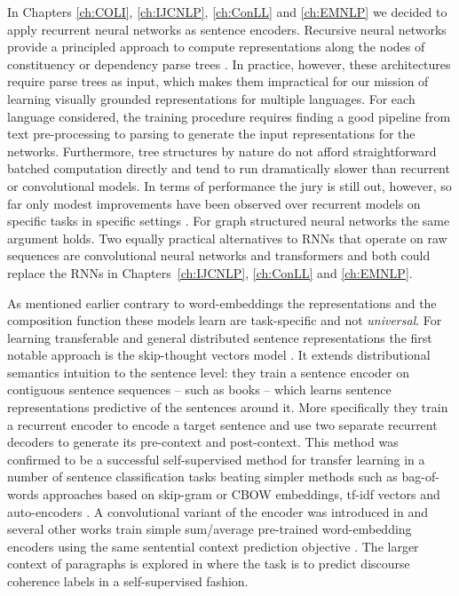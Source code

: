 In Chapters \ref{ch:COLI}, \ref{ch:IJCNLP}, \ref{ch:ConLL} and \ref{ch:EMNLP} we decided to apply
recurrent neural networks as sentence encoders.
Recursive neural networks provide a principled approach to
compute representations along the nodes of constituency
or dependency parse trees \citep{socher2013recursive,socher2014grounded,le2015compositional,kai2015treelstm}.
In practice, however, these architectures require parse trees as input,
which makes them impractical for our mission of learning visually grounded
representations for multiple languages.
For each language considered, the training procedure requires finding a good
pipeline from text pre-processing to parsing to generate the input representations
for the networks. Furthermore, tree structures by nature do not
afford straightforward batched computation directly and tend to run dramatically
slower than recurrent or convolutional models. In terms of performance the jury
is still out, however, so far only modest improvements have been observed
over recurrent models on specific tasks in specific settings
\citep{li2015tree,kai2015treelstm}. For graph structured neural networks the
same argument holds. Two equally practical alternatives to RNNs
that operate on raw sequences are convolutional neural networks
\citep{bai2018empirical} and transformers \citep{vaswani2017attention} and both could
replace the RNNs in Chapters~\ref{ch:IJCNLP}, \ref{ch:ConLL} and \ref{ch:EMNLP}.


As mentioned earlier contrary to word-embeddings the representations
and the composition function these models learn are task-specific and not \emph{universal}.
For learning transferable and general distributed sentence representations the
first notable approach is the
skip-thought vectors model \citep{kiros2015skip}.
It extends distributional semantics intuition to the sentence level:
they train a sentence encoder on contiguous sentence sequences
-- such as books -- which learns sentence representations predictive of the sentences around it.
More specifically
they train a recurrent encoder to encode a target sentence and use two separate recurrent decoders to
generate its pre-context and post-context.
This method was confirmed to be a successful self-supervised method for transfer
learning in a number of sentence
classification tasks beating simpler methods such as bag-of-words approaches based on skip-gram
or CBOW embeddings, tf-idf vectors and auto-encoders \citep{hill2016learning}. A convolutional
variant of the encoder was introduced in \cite{gan2016unsupervised} and several other works
train simple sum/average pre-trained word-embedding encoders using the same sentential
context prediction objective \citep{kenter2016siamese,hill2016learning}. The larger context of paragraphs is
explored in \cite{jernite2017discourse} where the task is to predict discourse coherence
labels in a self-supervised fashion.

